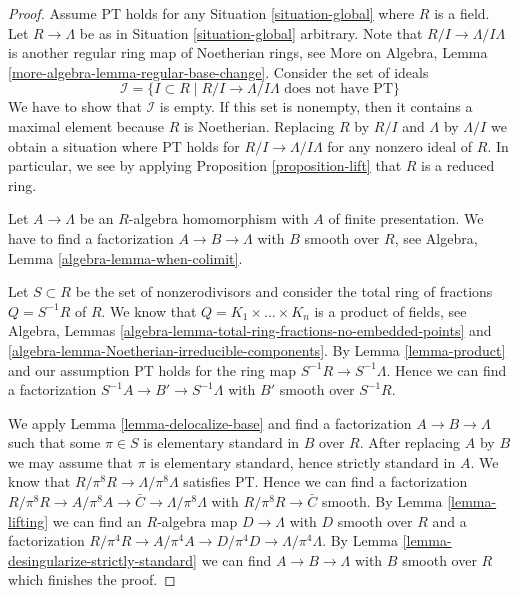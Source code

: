 \begin{proof}
Assume PT holds for any Situation \ref{situation-global} where $R$ is a field.
Let $R \to \Lambda$ be as in Situation \ref{situation-global} arbitrary.
Note that $R/I \to \Lambda/I\Lambda$ is another regular ring map
of Noetherian rings, see
More on Algebra, Lemma \ref{more-algebra-lemma-regular-base-change}.
Consider the set of ideals
$$
\mathcal{I} = \{I \subset R \mid R/I \to \Lambda/I\Lambda
\text{ does not have PT}\}
$$
We have to show that $\mathcal{I}$ is empty. If this set is nonempty,
then it contains a maximal element because $R$ is Noetherian.
Replacing $R$ by $R/I$ and $\Lambda$ by $\Lambda/I$ we obtain a
situation where PT holds for $R/I \to \Lambda/I\Lambda$ for any
nonzero ideal of $R$. In particular, we see by applying
Proposition \ref{proposition-lift}
that $R$ is a reduced ring.

\medskip\noindent
Let $A \to \Lambda$ be an $R$-algebra homomorphism with $A$ of
finite presentation. We have to find a factorization $A \to B \to \Lambda$
with $B$ smooth over $R$, see Algebra, Lemma \ref{algebra-lemma-when-colimit}.

\medskip\noindent
Let $S \subset R$ be the set of nonzerodivisors and
consider the total ring of fractions $Q = S^{-1}R$ of $R$. We know that
$Q = K_1 \times \ldots \times K_n$ is a product of fields, see
Algebra, Lemmas \ref{algebra-lemma-total-ring-fractions-no-embedded-points} and
\ref{algebra-lemma-Noetherian-irreducible-components}.
By Lemma \ref{lemma-product} and our assumption
PT holds for the ring map $S^{-1}R \to S^{-1}\Lambda$.
Hence we can find a factorization $S^{-1}A \to B' \to S^{-1}\Lambda$
with $B'$ smooth over $S^{-1}R$.

\medskip\noindent
We apply Lemma \ref{lemma-delocalize-base}
and find a factorization $A \to B \to \Lambda$ such that
some $\pi \in S$ is elementary standard in $B$ over $R$.
After replacing $A$ by $B$ we may assume that $\pi$ is
elementary standard, hence strictly standard in $A$. We know that
$R/\pi^8R \to \Lambda/\pi^8\Lambda$ satisfies PT.
Hence we can find a factorization
$R/\pi^8 R \to A/\pi^8A \to \bar C \to \Lambda/\pi^8\Lambda$
with $R/\pi^8 R \to \bar C$ smooth. By
Lemma \ref{lemma-lifting}
we can find an $R$-algebra map $D \to \Lambda$ with $D$ smooth over $R$
and a factorization
$R/\pi^4 R \to A/\pi^4A \to D/\pi^4D \to \Lambda/\pi^4\Lambda$.
By Lemma \ref{lemma-desingularize-strictly-standard}
we can find $A \to B \to \Lambda$ with $B$ smooth over $R$
which finishes the proof.
\end{proof}










